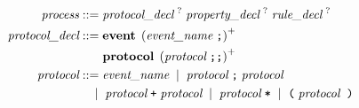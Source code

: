 \documentclass[preview=true]{standalone}
\begin{document}
\begin{table}[t]
\newcommand{\token}[1]{\textbf{#1}}
\begin{align*}
  \textit{process} &::=
  \textit{protocol\_decl}\;^?\;
   \textit{property\_decl}\;^?\;
   \textit{rule\_decl}\;^?\;
  \\
  \medskip
  \textit{protocol\_decl} &::=
    \token{event}\;
      \left( \textit{event\_name}\; \texttt{;} \right)^+
  \\&\hspace{1.9em}
  \token{protocol}\;
   \left(\textit{protocol}\; \texttt{;;}\right)^+
  \\
  \textit{protocol} &::=
  \textit{event\_name}\;
  \mid\; \textit{protocol}\; \texttt{;}\; \textit{protocol}\;
  \\&\quad
  \mid\;
  \textit{protocol}\; \texttt{+}\; \textit{protocol}\;
  \mid\;
  \textit{protocol}\; \texttt{*}\;
  \mid\;
  \texttt{(}\; \textit{protocol}\;\; \texttt{)}\;
  \\

\end{align*}
\end{table}
\end{document}

